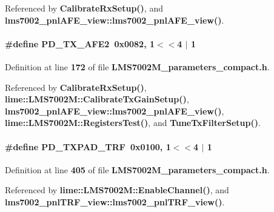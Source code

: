 Referenced by {\bf Calibrate\+Rx\+Setup()}, and {\bf lms7002\+\_\+pnl\+A\+F\+E\+\_\+view\+::lms7002\+\_\+pnl\+A\+F\+E\+\_\+view()}.

\paragraph[{P\+D\+\_\+\+T\+X\+\_\+\+A\+F\+E2}]{\setlength{\rightskip}{0pt plus 5cm}\#define P\+D\+\_\+\+T\+X\+\_\+\+A\+F\+E2~0x0082, 1$<$$<$4 $\vert$  1}\label{LMS7002M__parameters__compact_8h_acfc675921784b05228ec754f353fee71}


Definition at line {\bf 172} of file {\bf L\+M\+S7002\+M\+\_\+parameters\+\_\+compact.\+h}.



Referenced by {\bf Calibrate\+Rx\+Setup()}, {\bf lime\+::\+L\+M\+S7002\+M\+::\+Calibrate\+Tx\+Gain\+Setup()}, {\bf lms7002\+\_\+pnl\+A\+F\+E\+\_\+view\+::lms7002\+\_\+pnl\+A\+F\+E\+\_\+view()}, {\bf lime\+::\+L\+M\+S7002\+M\+::\+Registers\+Test()}, and {\bf Tune\+Tx\+Filter\+Setup()}.

\paragraph[{P\+D\+\_\+\+T\+X\+P\+A\+D\+\_\+\+T\+RF}]{\setlength{\rightskip}{0pt plus 5cm}\#define P\+D\+\_\+\+T\+X\+P\+A\+D\+\_\+\+T\+RF~0x0100, 1$<$$<$4 $\vert$  1}\label{LMS7002M__parameters__compact_8h_a473abb4dec3640aa7640beade5a97537}


Definition at line {\bf 405} of file {\bf L\+M\+S7002\+M\+\_\+parameters\+\_\+compact.\+h}.



Referenced by {\bf lime\+::\+L\+M\+S7002\+M\+::\+Enable\+Channel()}, and {\bf lms7002\+\_\+pnl\+T\+R\+F\+\_\+view\+::lms7002\+\_\+pnl\+T\+R\+F\+\_\+view()}.

